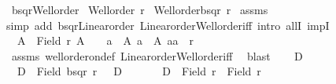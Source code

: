 \begin{isabellebody}
\ bsqr{\isacharunderscore}{\kern0pt}Well{\isacharunderscore}{\kern0pt}order{\isacharcolon}{\kern0pt}\isanewline
{}\ {\isachardoublequoteopen}Well{\isacharunderscore}{\kern0pt}order\ r{\isachardoublequoteclose}\isanewline
{}\ {\isachardoublequoteopen}Well{\isacharunderscore}{\kern0pt}order{\isacharparenleft}{\kern0pt}bsqr\ r{\isacharparenright}{\kern0pt}{\isachardoublequoteclose}\isanewline
%
\isadelimproof
%
\endisadelimproof
%
\isatagproof
{}\isamarkupfalse%
\ assms\isanewline
{}\isamarkupfalse%
{\isacharparenleft}{\kern0pt}simp\ add{\isacharcolon}{\kern0pt}\ bsqr{\isacharunderscore}{\kern0pt}Linear{\isacharunderscore}{\kern0pt}order\ Linear{\isacharunderscore}{\kern0pt}order{\isacharunderscore}{\kern0pt}Well{\isacharunderscore}{\kern0pt}order{\isacharunderscore}{\kern0pt}iff{\isacharcomma}{\kern0pt}\ intro\ allI\ impI{\isacharparenright}{\kern0pt}\isanewline
\ \ \isamarkupfalse%
\ {}{\isacharcolon}{\kern0pt}\ {\isachardoublequoteopen}{\isasymforall}A\ {\isasymle}\ Field\ r{\isachardot}{\kern0pt}\ A\ {\isasymnoteq}\ {\isacharbraceleft}{\kern0pt}{\isacharbraceright}{\kern0pt}\ {\isasymlongrightarrow}\ {\isacharparenleft}{\kern0pt}{\isasymexists}a\ {\isasymin}\ A{\isachardot}{\kern0pt}\ {\isasymforall}a{\isacharprime}{\kern0pt}\ {\isasymin}\ A{\isachardot}{\kern0pt}\ {\isacharparenleft}{\kern0pt}a{\isacharcomma}{\kern0pt}a{\isacharprime}{\kern0pt}{\isacharparenright}{\kern0pt}\ {\isasymin}\ r{\isacharparenright}{\kern0pt}{\isachardoublequoteclose}\isanewline
\ \ \isamarkupfalse%
\ assms\ well{\isacharunderscore}{\kern0pt}order{\isacharunderscore}{\kern0pt}on{\isacharunderscore}{\kern0pt}def\ Linear{\isacharunderscore}{\kern0pt}order{\isacharunderscore}{\kern0pt}Well{\isacharunderscore}{\kern0pt}order{\isacharunderscore}{\kern0pt}iff\ \isamarkupfalse%
\ blast\isanewline
\ \ \isamarkupfalse%
\ D\ \isamarkupfalse%
\ {\isacharasterisk}{\kern0pt}{\isacharcolon}{\kern0pt}\ {\isachardoublequoteopen}D\ {\isasymle}\ Field\ {\isacharparenleft}{\kern0pt}bsqr\ r{\isacharparenright}{\kern0pt}{\isachardoublequoteclose}\ \ {\isacharasterisk}{\kern0pt}{\isacharasterisk}{\kern0pt}{\isacharcolon}{\kern0pt}\ {\isachardoublequoteopen}D\ {\isasymnoteq}\ {\isacharbraceleft}{\kern0pt}{\isacharbraceright}{\kern0pt}{\isachardoublequoteclose}\isanewline
\ \ \isamarkupfalse%
\ {}{\isacharcolon}{\kern0pt}\ {\isachardoublequoteopen}D\ {\isasymle}\ Field\ r\ {\isasymtimes}\ Field\ r{\isachardoublequoteclose}\ \isamarkupfalse%

\end{isabellebody}
